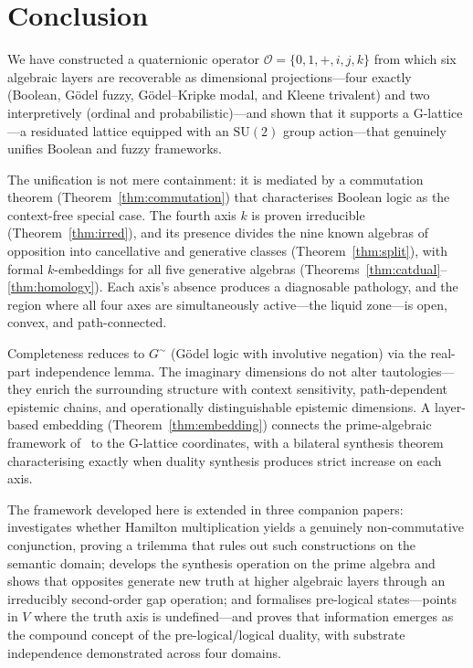 \documentclass[11pt,a4paper]{article}
\newcommand{\Op}{\mathcal{O}}
\newcommand{\imag}[1]{{\color{icolor}#1}}
\newcommand{\exac}[1]{{\color{jcolor}#1}}
\newcommand{\recu}[1]{{\color{kcolor}#1}}
\newcommand{\SU}{\mathrm{SU}(2)}
\def\imag#1{#1}%
\def\exac#1{#1}%
\def\recu#1{#1}%
\begin{document}
\section{Conclusion}
\label{sec:conclusion}

We have constructed a quaternionic operator
$\Op=\{0,1,+,\imag{i},\exac{j},\recu{k}\}$ from which six algebraic
layers are recoverable as dimensional projections---four exactly
(Boolean, G\"odel fuzzy, G\"odel--Kripke modal, and Kleene
trivalent) and two interpretively (ordinal and probabilistic)---and
shown that it supports a G-lattice---a residuated lattice equipped
with an $\SU$ group action---that genuinely unifies Boolean and fuzzy
frameworks.

The unification is not mere containment: it is mediated by a
commutation theorem (Theorem~\ref{thm:commutation}) that characterises
Boolean logic as the context-free special case. The fourth axis
$\recu{k}$ is proven irreducible (Theorem~\ref{thm:irred}), and its
presence divides the nine known algebras of opposition into
cancellative and generative classes
(Theorem~\ref{thm:split}), with formal $\recu{k}$-embeddings for
all five generative algebras
(Theorems~\ref{thm:catdual}--\ref{thm:homology}). Each axis's absence produces a
diagnosable pathology, and the region where all four axes are
simultaneously active---the liquid zone---is open, convex, and
path-connected.

Completeness reduces to $G^\sim$ (G\"odel logic with involutive
negation) via the real-part independence lemma. The imaginary
dimensions do not alter tautologies---they enrich the surrounding
structure with context sensitivity, path-dependent epistemic chains,
and operationally distinguishable epistemic dimensions. A layer-based
embedding (Theorem~\ref{thm:embedding}) connects the prime-algebraic
framework of~\citet{p4} to the G-lattice coordinates, with a bilateral
synthesis theorem characterising exactly when duality synthesis
produces strict increase on each axis.

The framework developed here is extended in three companion papers:
\citet{p11_1} investigates whether Hamilton multiplication yields a
genuinely non-commutative conjunction, proving a trilemma that rules
out such constructions on the semantic domain;
\citet{p12} develops the synthesis operation on the prime algebra and
shows that opposites generate new truth at higher algebraic layers
through an irreducibly second-order gap operation; and
\citet{p13} formalises pre-logical states---points in $V$ where the
truth axis is undefined---and proves that information emerges as
the compound concept of the pre-logical/\allowbreak logical duality,
with substrate independence demonstrated across four domains.
\end{document}
